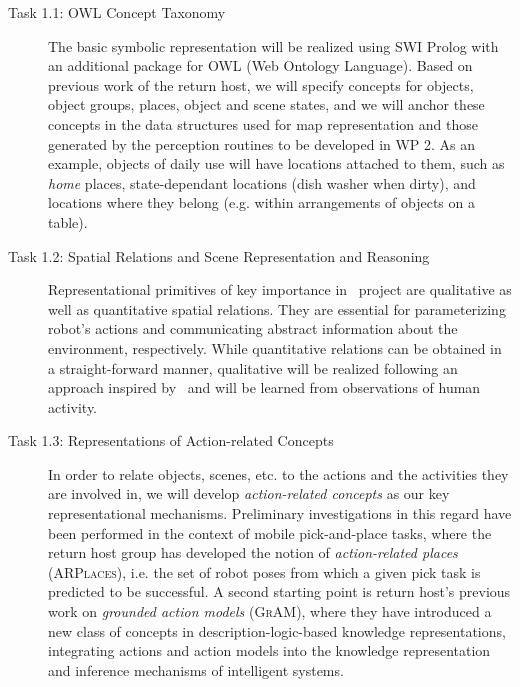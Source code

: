 \begin{description}
  \item[Task 1.1: OWL Concept Taxonomy] The basic symbolic
    representation will be realized using SWI Prolog with an additional
    package for OWL (Web Ontology Language). Based on previous work of
    the return host, we will specify concepts for objects, object groups,
    places, object and scene states, and we will anchor these concepts
    in the data structures used for map representation and those
    generated by the perception routines to be developed in WP 2.
    As an example, objects of daily use will have locations attached to
    them, such as \emph{home} places, state-dependant locations (dish
    washer when dirty), and locations where they belong (e.g. within
    arrangements of objects on a table).
  \item[Task 1.2: Spatial Relations and Scene Representation and
    Reasoning] Representational primitives of key importance in
    \ksem\ project are qualitative as well as quantitative spatial relations.
    They are essential for parameterizing robot's actions and
    communicating abstract information about the environment,
    respectively. While quantitative relations can be obtained in a
    straight-forward manner, qualitative will be realized following an
    approach inspired by~\cite{Gapp95} and will be learned from
    observations of human activity.
    
  \item[Task 1.3: Representations of Action-related Concepts]
    In order to relate objects, scenes, etc. to the actions and the
    activities they are involved in, we will develop \emph{action-related
    concepts} as our key representational mechanisms. Preliminary
    investigations in this regard have been performed in the context
    of mobile pick-and-place tasks, where the return host group has
    developed the notion of \emph{action-related places} (\textsc{ARPlaces}), i.e. the
    set of robot poses from which a given pick task is predicted to be
    successful. A second starting point is return host's previous work on
    \emph{grounded action models} (\textsc{GrAM}), where they have introduced a
    new class of concepts in description-logic-based knowledge
    representations, integrating actions and action models into the
    knowledge representation and inference mechanisms of intelligent
    systems. 
     

\end{description}
